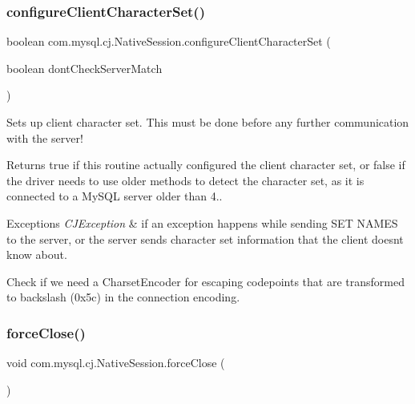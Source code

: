 \subsubsection{\texorpdfstring{configure\+Client\+Character\+Set()}{configureClientCharacterSet()}}
{\footnotesize\ttfamily boolean com.\+mysql.\+cj.\+Native\+Session.\+configure\+Client\+Character\+Set (\begin{DoxyParamCaption}\item[{boolean}]{dont\+Check\+Server\+Match }\end{DoxyParamCaption})}

Sets up client character set. This must be done before any further communication with the server!

\begin{DoxyReturn}{Returns}
true if this routine actually configured the client character set, or false if the driver needs to use \textquotesingle{}older\textquotesingle{} methods to detect the character set, as it is connected to a My\+S\+QL server older than 4.. 
\end{DoxyReturn}

\begin{DoxyExceptions}{Exceptions}
{\em C\+J\+Exception} & if an exception happens while sending \textquotesingle{}S\+ET N\+A\+M\+ES\textquotesingle{} to the server, or the server sends character set information that the client doesn\textquotesingle{}t know about. \\
\hline
\end{DoxyExceptions}
Check if we need a Charset\+Encoder for escaping codepoints that are transformed to backslash (0x5c) in the connection encoding.\mbox{\label{classcom_1_1mysql_1_1cj_1_1_native_session_abb14a063cc3946e6645393135f776164}} 
\subsubsection{\texorpdfstring{force\+Close()}{forceClose()}}
{\footnotesize\ttfamily void com.\+mysql.\+cj.\+Native\+Session.\+force\+Close (\begin{DoxyParamCaption}{ }\end{DoxyParamCaption})}

